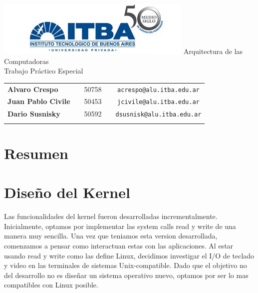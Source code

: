 \documentclass[a4paper,10pt]{article}
\begin{document}
\begin{titlepage}
        \thispagestyle{empty}
        \begin{center}
                \includegraphics{./images/itba.jpg}
                \vfill
                \Huge{Arquitectura de las Computadoras}\\
                \vspace{1cm}
                \huge{Trabajo Práctico Especial}\\
        \end{center}
        \vspace{2cm}
        \large{
                \begin{tabular}{lcrc}
                        \textbf{Alvaro Crespo} & & 50758 & \ \ \texttt{acrespo@alu.itba.edu.ar}\\
                        \textbf{Juan Pablo Civile} & & 50453 & \ \ \texttt{jcivile@alu.itba.edu.ar}\\
                        \textbf{Dario Susnisky} & & 50592 & \ \ \texttt{dsusnisk@alu.itba.edu.ar}\\
                        \\ 
                \end{tabular}
        }
        \vfill
\end{titlepage}

\setcounter{page}{1}

\tableofcontents
\newpage

\section{Resumen}

\section{Diseño del Kernel}
    Las funcionalidades del kernel fueron desarrolladas incrementalmente. Inicialmente, optamos por implementar las system calls read y write de una manera muy sencilla.
    Una vez que teniamos esta version desarrollada, comenzamos a pensar como interactuan estas con las aplicaciones. 
    Al estar usando read y write como las define Linux, decidimos investigar el I/O de teclado y video en las terminales de sistemas Unix-compatible.
    Dado que el objetivo no del desarrollo no es diseñar un sistema operativo nuevo, optamos por ser lo mas compatibles con Linux posible.
\end{document}

